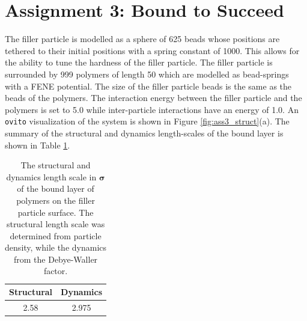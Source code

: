 \documentclass[10pt,a4paper]{labreport}
\begin{document}
\newpage
\section{Assignment 3: Bound to Succeed}
The filler particle is modelled as a sphere of 625 beads whose positions are tethered to their initial positions with a spring constant of 1000. 
This allows for the ability to tune the hardness of the filler particle.
The filler particle is surrounded by 999 polymers of length 50 which are modelled as bead-springs with a FENE potential. 
The size of the filler particle beads is the same as the beads of the polymers.
The interaction energy between the filler particle and the polymers is set to 5.0 while inter-particle interactions have an energy of 1.0.  
An \texttt{ovito} visualization of the system is shown in Figure \ref{fig:ass3_struct}(a). The summary of the structural and dynamics length-scales of the bound layer is shown in Table \ref{tab:ass3_length_scales}.

\begin{table}[h!]
  \centering
  \caption{The structural and dynamics length scale in $\bm{\sigma}$ of the bound layer of polymers on the filler particle surface. The structural length scale was determined from particle density, while the dynamics from the Debye-Waller factor. }
  \begin{tabular}{cc}
    \hline
    \textbf{Structural} & \textbf{Dynamics} \\ \hline
    2.58 & 2.975  \\ \hline
  \end{tabular}
  \label{tab:ass3_length_scales}
\end{table}
\end{document}
